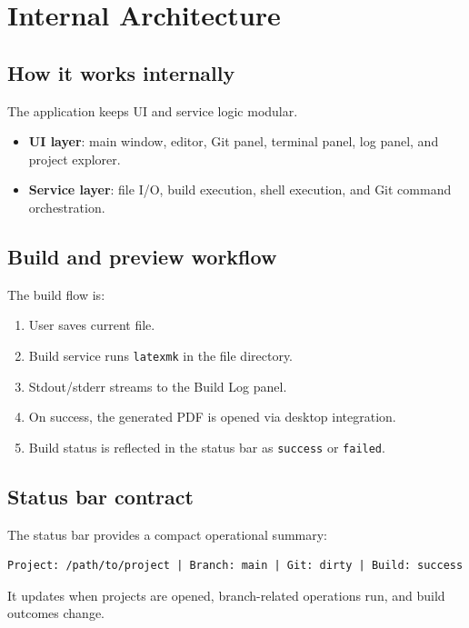\chapter{Internal Architecture}
\minitoc

\section{How it works internally}
The application keeps UI and service logic modular.

\begin{itemize}
  \item \textbf{UI layer}: main window, editor, Git panel, terminal panel, log panel, and project explorer.
  \item \textbf{Service layer}: file I/O, build execution, shell execution, and Git command orchestration.
\end{itemize}

\section{Build and preview workflow}
The build flow is:
\begin{enumerate}
  \item User saves current file.
  \item Build service runs \texttt{latexmk} in the file directory.
  \item Stdout/stderr streams to the Build Log panel.
  \item On success, the generated PDF is opened via desktop integration.
  \item Build status is reflected in the status bar as \texttt{success} or \texttt{failed}.
\end{enumerate}

\section{Status bar contract}
The status bar provides a compact operational summary:
\begin{lstlisting}[style=textstyle]
Project: /path/to/project | Branch: main | Git: dirty | Build: success
\end{lstlisting}
It updates when projects are opened, branch-related operations run, and build outcomes change.
